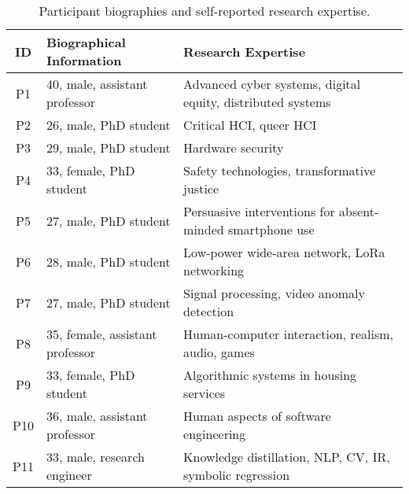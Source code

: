 \begin{table*}[t]
\centering
\small
\renewcommand{\arraystretch}{1.2} 
\caption{Participant biographies and self-reported research expertise.}
\begin{tabular}{cp{}p{}}
\toprule
\textbf{ID} & \textbf{Biographical Information} & \textbf{Research Expertise} \\ 
\midrule
P1 & 40, male, assistant professor & Advanced cyber systems, digital equity, distributed systems \\
P2 & 26, male, PhD student & Critical HCI, queer HCI \\
P3 & 29, male, PhD student & Hardware security \\
P4 & 33, female, PhD student & Safety technologies, transformative justice \\
P5 & 27, male, PhD student & Persuasive interventions for absent-minded smartphone use \\
P6 & 28, male, PhD student & Low-power wide-area network, LoRa networking \\
P7 & 27, male, PhD student & Signal processing, video anomaly detection \\
P8 & 35, female, assistant professor & Human-computer interaction, realism, audio, games \\
P9 & 33, female, PhD student & Algorithmic systems in housing services \\
P10 & 36, male, assistant professor & Human aspects of software engineering \\
P11 & 33, male, research engineer & Knowledge distillation, NLP, CV, IR, symbolic regression \\
\bottomrule
\end{tabular}
\label{tab:participant_demographics}
\end{table*}

